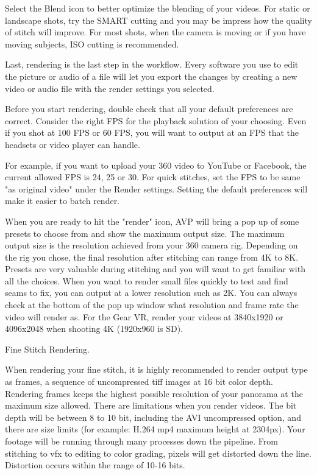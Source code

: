 \begin{fullwidth}

Select the Blend icon to better optimize the blending of your videos. For static or landscape shots, try the SMART cutting and you may be impress how the quality of stitch will improve. For most shots, when the camera is moving or if you have moving subjects, ISO cutting is recommended.

Last, rendering is the last step in the workflow. Every software you use to edit the picture or audio of a file will let you export the changes by creating a new video or audio file with the render settings you selected.

Before you start rendering, double check that all your default preferences are correct. Consider the right FPS for the playback solution of your choosing. Even if you shot at 100 FPS or 60 FPS, you will want to output at an FPS that the headsets or video player can handle. 

For example, if you want to upload your 360 video to YouTube or Facebook, the current allowed FPS is 24, 25 or 30. For quick stitches, set the FPS to be same "as original video" under the Render settings. Setting the default preferences will make it easier to batch render.


When you are ready to hit the "render" icon, AVP will bring a pop up of some presets to choose from and show the maximum output size. The maximum output size is the resolution achieved from your 360 camera rig. Depending on the rig you chose, the final resolution after stitching can range from 4K to 8K. Presets are very valuable during stitching and you will want to get familiar with all the choices. When you want to render small files quickly to test and find seams to fix, you can output at a lower resolution such as 2K. You can always check at the bottom of the pop up window what resolution and frame rate the video will render as. For the Gear VR, render your videos at 3840x1920 or 4096x2048 when shooting 4K (1920x960 is SD).

{\large Fine Stitch Rendering. \par}

When rendering your fine stitch, it is highly recommended to render output type as frames, a sequence of uncompressed tiff images at 16 bit color depth. Rendering frames keeps the highest possible resolution of your panorama at the maximum size allowed. There are limitations when you render videos. The bit depth will be between 8 to 10 bit, including the AVI uncompressed option, and there are size limits (for example: H.264 mp4 maximum height at 2304px). Your footage will be running through many processes down the pipeline.
From stitching to vfx to editing to color grading, pixels will get distorted down the line. Distortion occurs within the range of 10-16 bits. 


\end{fullwidth}
